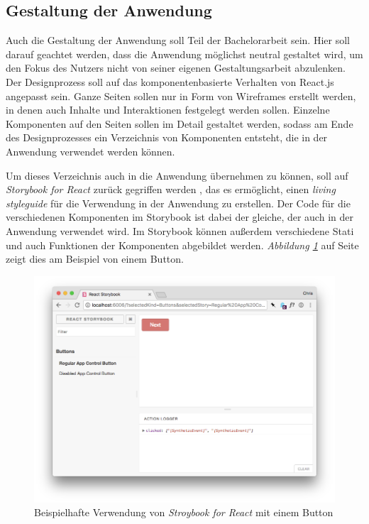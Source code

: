 \subsection{Gestaltung der Anwendung}
Auch die Gestaltung der Anwendung soll Teil der Bachelorarbeit sein. Hier soll darauf geachtet werden, dass die Anwendung möglichst neutral gestaltet wird, um den Fokus des Nutzers nicht von seiner eigenen Gestaltungsarbeit abzulenken.\\
Der Designprozess soll auf das komponentenbasierte Verhalten von React.js angepasst sein. Ganze Seiten sollen  nur in Form von Wireframes erstellt werden, in denen auch Inhalte und Interaktionen festgelegt werden sollen. Einzelne Komponenten auf den Seiten sollen im Detail gestaltet werden, sodass am Ende des Designprozesses ein Verzeichnis von Komponenten entsteht, die in der Anwendung verwendet werden können.

Um dieses Verzeichnis auch in die Anwendung übernehmen zu können, soll auf \textit{Storybook for React} zurück gegriffen werden \cite{StorybooksOnline}, das es ermöglicht, einen \textit{living styleguide} für die Verwendung in der Anwendung zu erstellen. Der Code für die verschiedenen Komponenten im Storybook ist dabei der gleiche, der auch in der Anwendung verwendet wird. Im Storybook können außerdem verschiedene Stati und auch Funktionen der Komponenten abgebildet werden. \textit{Abbildung \ref{fig:storybook}} auf Seite \pageref{fig:storybook} zeigt dies am Beispiel von einem Button.

\begin{figure}[h]
  \centering
  \includegraphics[width=1\textwidth]{images/ReactStroybooksExample.png}
  \caption{Beispielhafte Verwendung von \textit{Stroybook for React} mit einem Button}
  \label{fig:storybook}
\end{figure}

